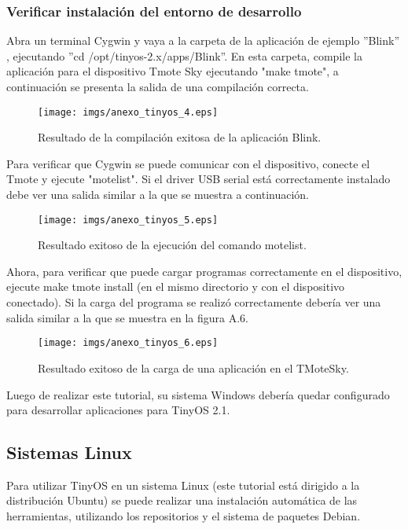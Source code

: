 \subsubsection{Verificar instalación del entorno de desarrollo}
Abra un terminal Cygwin y vaya a la carpeta de la aplicación de ejemplo ''Blink'' , ejecutando ''cd /opt/tinyos-2.x/apps/Blink''. En esta carpeta, compile la aplicación para el dispositivo Tmote Sky ejecutando "make tmote", a continuación se presenta la salida de una compilación correcta.

\begin{center}
\begin{figure}[H]
\centering
\texttt{[image: imgs/anexo\_tinyos\_4.eps]} 
\caption{Resultado de la compilación exitosa de la aplicación Blink.}
\end{figure}
\end{center}

Para verificar que Cygwin se puede comunicar con el dispositivo, conecte el Tmote y ejecute "motelist". Si el driver USB serial está correctamente instalado debe ver una salida similar a la que se muestra a continuación.

\begin{center}
\begin{figure}[H]
\centering
\texttt{[image: imgs/anexo\_tinyos\_5.eps]} 
\caption{Resultado exitoso de la ejecución del comando motelist.}
\end{figure}
\end{center}

Ahora, para verificar que puede cargar programas correctamente en el  dispositivo, ejecute make tmote install (en el mismo directorio y con el dispositivo conectado). Si la carga del programa se realizó correctamente debería ver una salida similar a la que se muestra en la figura A.6.

\begin{center}
\begin{figure}[H]
\centering
\texttt{[image: imgs/anexo\_tinyos\_6.eps]} 
\caption{Resultado exitoso de la carga de una aplicación en el TMoteSky.}
\end{figure}
\end{center}

Luego de realizar este tutorial, su sistema Windows debería quedar configurado para desarrollar aplicaciones para TinyOS 2.1.

\subsection{Sistemas Linux}
Para utilizar TinyOS en un sistema Linux (este tutorial está dirigido a la distribución Ubuntu) se puede realizar una instalación automática de las herramientas, utilizando los repositorios y el sistema de paquetes Debian. 

